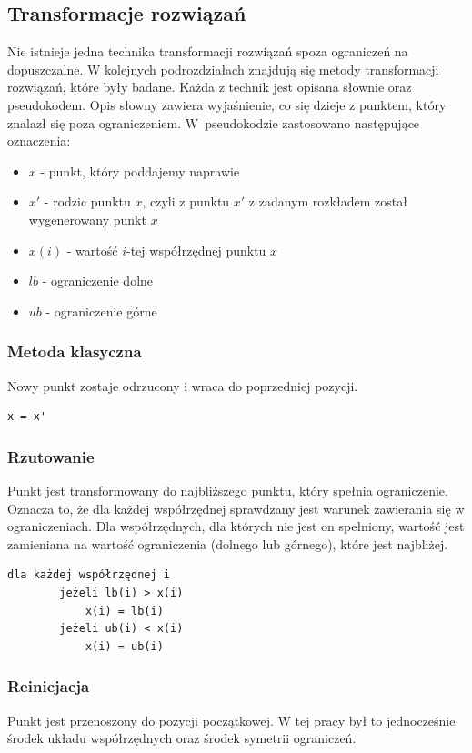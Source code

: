 \documentclass{mini}
\begin{document}
\subsection{Transformacje rozwiązań} \label{transformacje}
Nie istnieje jedna technika transformacji rozwiązań spoza ograniczeń na dopuszczalne. W kolejnych podrozdziałach znajdują się metody transformacji rozwiązań, które były badane. Każda z technik jest opisana słownie oraz pseudokodem. Opis słowny zawiera wyjaśnienie, co się dzieje z punktem, który znalazł się poza ograniczeniem. W~pseudokodzie zastosowano następujące oznaczenia:
\begin{itemize}[noitemsep]
\item $x$ - punkt, który poddajemy naprawie
\item $x'$ - rodzic punktu $x$, czyli z punktu $x'$ z zadanym rozkładem został wygenerowany punkt $x$
\item $x(i)$ - wartość $i$-tej współrzędnej punktu $x$
\item $lb$ - ograniczenie dolne
\item $ub$ - ograniczenie górne
\end{itemize}

\subsubsection{Metoda klasyczna}
Nowy punkt zostaje odrzucony i wraca do poprzedniej pozycji.

\begin{Verbatim}[baselinestretch=1.1]
	x = x'
\end{Verbatim}


\subsubsection{Rzutowanie}
Punkt jest transformowany do najbliższego punktu, który spełnia ograniczenie. Oznacza to, że dla każdej współrzędnej sprawdzany jest warunek zawierania się w ograniczeniach. Dla współrzędnych, dla których nie jest on spełniony, wartość jest zamieniana na wartość ograniczenia (dolnego lub górnego), które jest najbliżej.

\begin{Verbatim}[baselinestretch=1.1]
	dla każdej współrzędnej i
		jeżeli lb(i) > x(i)
			x(i) = lb(i)
		jeżeli ub(i) < x(i)
			x(i) = ub(i)
\end{Verbatim}

\subsubsection{Reinicjacja}
Punkt jest przenoszony do pozycji początkowej. W tej pracy był to jednocześnie środek układu współrzędnych oraz środek symetrii ograniczeń.
\end{document}

